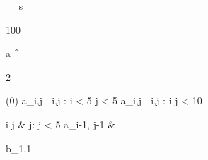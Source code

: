 \begin{eqcode}{\mu}{\ }{\ }{}
  s \gets \begin {tmatrix}
  100  \lend
  \end{tmatrix} \lend
   \lend
  a \gets \genar \limits ^{\begin{tmatrix} 2  \lend \end{tmatrix}} (0) \lend
   \lend
  a_{i,j} | i,j : i < 5 \cap j < 5  \lend
   \lend
  a_{i,j} | i,j : i  \cap j < 10 \gets
  \begin{cases}
    i \cdot j & j: j < 5 \lend
    a_{i-1, j-1} & \otherwise \lend
  \end{cases} \lend
   \lend
  b_{1,1}  \lend %
   \lend
   \lend
\end{eqcode}
